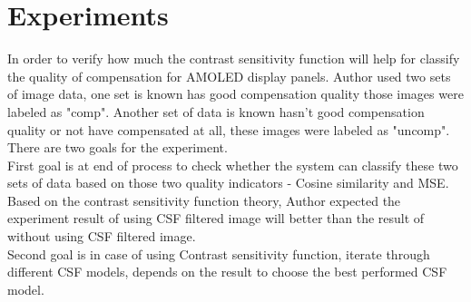 \documentclass{article}
\begin{document}
\section{Experiments}
In order to verify how much the contrast sensitivity function will help for classify the quality of compensation for AMOLED display panels. Author used two sets of image data, one set is known has good compensation quality those images were labeled as "comp". Another set of data is known hasn't good compensation quality or not have compensated at all, these images were labeled as "uncomp". There are two goals for the experiment.\\
First goal is at end of process to check whether the system can classify these two sets of data based on those two quality indicators - Cosine similarity and MSE. Based on the contrast sensitivity function theory, Author expected the experiment result of using CSF filtered image will better than the result of without using CSF filtered image.\\
Second goal is in case of using Contrast sensitivity function, iterate through different CSF models, depends on the result to choose the best performed CSF model.
\end{document}
